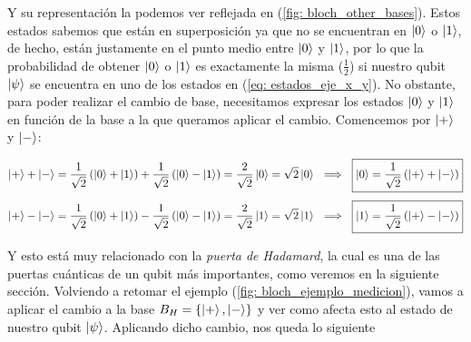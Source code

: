 \documentclass{article}
\numberwithin{equation}{section} %
\begin{document}
    \vspace{2.5mm}

    Y su representación la podemos ver reflejada en (\ref{fig: bloch_other_bases}). Estos estados sabemos que están en superposición ya que no se encuentran en \( \ket{0} \) o \( \ket{1} \), de hecho, están justamente en el punto medio entre \( \ket{0} \) y \( \ket{1} \), por lo que la probabilidad de obtener \( \ket{0} \) o \( \ket{1} \) es exactamente la misma (\( \frac{1}{2} \)) si nuestro qubit \( \ket{\psi} \) se encuentra en uno de los estados en (\ref{eq: estados_eje_x_y}). No obstante, para poder realizar el cambio de base, necesitamos expresar los estados \( \ket{0} \) y \( \ket{1} \) en función de la base a la que queramos aplicar el cambio. Comencemos por \( \ket{+} \) y \( \ket{-} \):

    \begin{equation}
        \ket{+} + \ket{-} = \frac{1}{\sqrt{2}} \left( \ket{0} + \ket{1} \right) + \frac{1}{\sqrt{2}} \left( \ket{0} - \ket{1} \right) = \frac{2}{\sqrt{2}} \ket{0} = \sqrt{2} \ket{0} \ \implies \ \boxed{\ket{0} = \frac{1}{\sqrt{2}} \left( \ket{+} + \ket{-} \right)} 
        \label{eq: estado_0_en_funcion_mas_menos}
    \end{equation}
    \begin{equation}
        \ket{+} - \ket{-} = \frac{1}{\sqrt{2}} \left( \ket{0} + \ket{1} \right) - \frac{1}{\sqrt{2}} \left( \ket{0} - \ket{1} \right) = \frac{2}{\sqrt{2}} \ket{1} = \sqrt{2} \ket{1} \ \implies \ \boxed{\ket{1} = \frac{1}{\sqrt{2}} \left( \ket{+} - \ket{-} \right)}
        \label{eq: estado_1_en_funcion_mas_menos}
    \end{equation}

    \vspace{5mm}

    Y esto está muy relacionado con la \textit{puerta de Hadamard}, la cual es una de las puertas cuánticas de un qubit más importantes, como veremos en la siguiente sección. Volviendo a retomar el ejemplo (\ref{fig: bloch_ejemplo_medicion}), vamos a aplicar el cambio a la base \( B_{H} = \left\{ \ket{+}, \ket{-} \right\}\) y ver como afecta esto al estado de nuestro qubit \( \ket{\psi} \). Aplicando dicho cambio, nos queda lo siguiente
\end{document}
